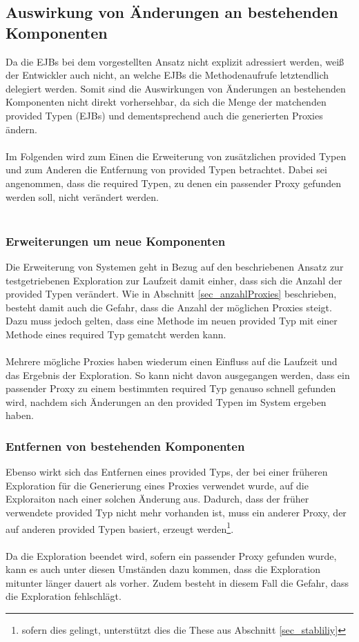 \subsection{Auswirkung von Änderungen an bestehenden Komponenten}
Da die EJBs bei dem vorgestellten Ansatz nicht explizit adressiert werden, weiß der Entwickler auch nicht, an welche EJBs die Methodenaufrufe letztendlich delegiert werden. Somit sind die Auswirkungen von Änderungen an bestehenden Komponenten nicht direkt vorhersehbar, da sich die Menge der matchenden provided Typen (EJBs) und dementsprechend auch die generierten Proxies ändern.
\\\\
Im Folgenden wird zum Einen die Erweiterung von zusätzlichen provided Typen und zum Anderen die Entfernung von provided Typen betrachtet. Dabei sei angenommen, dass die required Typen, zu denen ein passender Proxy gefunden werden soll, nicht verändert werden.
\\\\
\subsubsection{Erweiterungen um neue Komponenten}
Die Erweiterung von Systemen geht in Bezug auf den beschriebenen Ansatz zur testgetriebenen Exploration zur Laufzeit damit einher, dass sich die Anzahl der provided Typen verändert. Wie in Abschnitt \ref{sec_anzahlProxies} beschrieben, besteht damit auch die Gefahr, dass die Anzahl der möglichen Proxies steigt. Dazu muss jedoch gelten, dass eine Methode im neuen provided Typ mit einer Methode eines required Typ gematcht werden kann.
\\\\
Mehrere mögliche Proxies haben wiederum einen Einfluss auf die Laufzeit und das Ergebnis der Exploration. So kann nicht davon ausgegangen werden, dass ein passender Proxy zu einem bestimmten required Typ genauso schnell gefunden wird, nachdem sich Änderungen an den provided Typen im System ergeben haben.
\subsubsection{Entfernen von bestehenden Komponenten}
Ebenso wirkt sich das Entfernen eines provided Typs, der bei einer früheren Exploration für die Generierung eines Proxies verwendet wurde, auf die Exploraiton nach einer solchen Änderung aus. Dadurch, dass der früher verwendete provided Typ nicht mehr vorhanden ist, muss ein anderer Proxy, der auf anderen provided Typen basiert, erzeugt werden\footnote{sofern dies gelingt, unterstützt dies die These aus Abschnitt \ref{sec_stabliliy}}.
\\\\
Da die Exploration beendet wird, sofern ein passender Proxy gefunden wurde, kann es auch unter diesen Umständen dazu kommen, dass die Exploration mitunter länger dauert als vorher. Zudem besteht in diesem Fall die Gefahr, dass die Exploration fehlschlägt.

